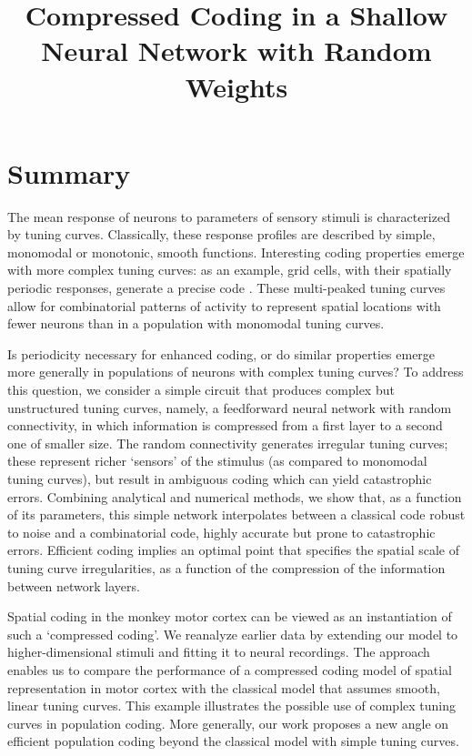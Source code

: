\documentclass[a4paper]{article}%
\begin{document}
\title{\vspace{-5em} Compressed Coding in a Shallow Neural Network with Random Weights}
\author{

}
\date{}
\maketitle

\section{Summary}

The mean response of neurons to parameters of sensory stimuli is characterized
by tuning curves. Classically, these response profiles are described
by simple, monomodal or monotonic, smooth functions. Interesting coding
properties emerge with more complex tuning curves: as an example,
grid cells, with their spatially periodic responses, generate a
precise code \cite{Sreenivasan2011GridComputation}. These multi-peaked tuning
curves allow for combinatorial patterns of activity to represent
spatial locations with fewer neurons than in a population
with monomodal tuning curves.

Is periodicity necessary for enhanced coding, or do similar
properties emerge more generally in populations of neurons with
complex tuning curves? To address this question, we consider
a simple circuit that produces complex but unstructured tuning curves, namely,
a feedforward neural network with random connectivity, in which
information is compressed from a first layer to a second one of smaller size.
The random connectivity generates irregular tuning curves; these
represent richer `sensors' of the stimulus (as compared to monomodal
tuning curves), but result in ambiguous coding which can yield catastrophic
errors. Combining analytical and numerical methods, we show that, as a
function of its parameters, this simple network interpolates between a
classical code robust to noise and a combinatorial code, highly accurate but
prone to catastrophic errors. Efficient coding implies an optimal point that
specifies the spatial scale of tuning curve irregularities, as a function of
the compression of the information between network layers.

Spatial coding in the monkey motor cortex can be viewed as an
instantiation of such a `compressed coding'. We reanalyze earlier data
\cite{Lalazar2016TuningConnectivity} by extending our model to
higher-dimensional stimuli and fitting it to neural recordings. The approach
enables us to compare the performance of a compressed coding model of spatial
representation in motor cortex with the classical model that assumes smooth,
linear tuning curves. This example illustrates the possible use of complex
tuning curves in population coding. More generally, our work proposes a new
angle on efficient population coding beyond the classical model with simple
tuning curves.
\end{document}
